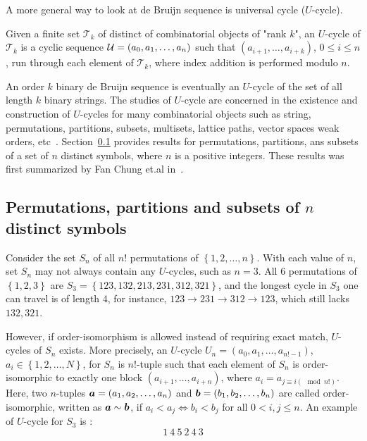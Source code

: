 A more general way to look at de Bruijn sequence is universal cycle ($U$-cycle). 
\begin{definition}
    Given a finite set $\mathcal{T}_{k}$ of distinct of combinatorial objects of "rank $k$", an $U$-cycle of $\mathcal{T}_{k}$ is a cyclic sequence ${\cal U}=(a_0,a_1,\ldots,a_n)$ such that $(a_{i+1},\ldots,a_{i+k})$, $0\leq i\leq n$, run through each element of $\mathcal{T}_{k}$, where index addition is performed modulo $n$.
\end{definition} 
An order $k$ binary de Bruijn sequence is eventually an $U$-cycle of the set of all length $k$ binary strings. The studies of $U$-cycle are concerned in the existence and construction of $U$-cycles for many combinatorial objects such as string, permutations, partitions, subsets, multisets, lattice paths, vector spaces weak orders, etc~\cite{chung1992universal,horan2013universal,jackson2009research,johnson2009universal,hurlbert2009universal,jackson2009recursive}. Section~\ref{subsect:fanchung} provides results for permutations, partitions, ans subsets of a set of $n$ distinct symbols, where $n$ is a positive integers. These results was first summarized by Fan Chung et.al in~\cite{chung1992universal}.

\subsection{Permutations, partitions and subsets of \texorpdfstring{$n$}{n} distinct symbols}\label{subsect:fanchung}
Consider the set $S_{n}$ of all $n!$ permutations of $\left\{1,2,\ldots,n\right\}$. With each value of $n$, set $S_{n}$ may not always contain any $U$-cycles, such as $n=3$. All $6$ permutations of $\left\{1,2,3\right\}$ are $S_{3}=\left\{123,132,213,231,312,321\right\}$, and the longest cycle in $S_{3}$ one can travel is of length $4$, for instance,  $123\rightarrow231\rightarrow312\rightarrow123$, which still lacks $132, 321$. 

However, if order-isomorphism is allowed instead of requiring exact match, $U$-cycles of $S_{n}$ exists. More precisely, an $U$-cycle $U_{n}=(a_{0},a_{1},\ldots,a_{n!-1})$, $a_{i}\in\left\{1,2,\ldots,N\right\}$, for $S_{n}$ is $n!$-tuple such that each element of $S_{n}$ is order-isomorphic to exactly one block $(a_{i+1},\ldots,a_{i+n})$, where $a_{i}=a_{j\equiv i(\mod n!)}$. Here, two $n$-tuples ${\boldsymbol a}=\left(a_{1},a_{2},\ldots,a_{n}\right)$ and ${\boldsymbol b}=\left(b_{1},b_{2},\ldots,b_{n}\right)$ are called order-isomorphic, written as ${\boldsymbol a}\sim{\boldsymbol b}$, if $a_{i}<a_{j} \Leftrightarrow b_{i}<b_{j}$ for all $0<i,j\leq n$. An example of $U$-cycle for $S_{3}$ is :
\[1\ 4\ 5\ 2\ 4 \ 3\]

